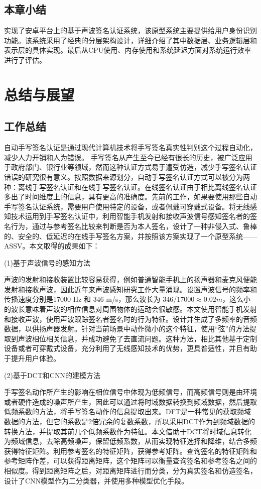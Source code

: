 \section{本章小结}
实现了安卓平台上的基于声波签名认证系统，该原型系统主要提供给用户身份识别功能。该系统采用了经典的分层架构设计，详细介绍了其中数据层、业务逻辑层和表示层的具体实现。最后从CPU使用、内存使用和系统延迟方面对系统运行效率进行了评估。

\chapter{总结与展望}

\section{工作总结}

自动手写签名认证是通过现代计算机技术将手写签名真实性判别这个过程自动化，减少人力开销和人为错误。 手写签名从产生至今已经有很长的历史，被广泛应用于政府部门、银行业等领域，然而这种认证方式易于遭受仿造，减少手写签名认证错误的研究很有意义。按照数据来源划分，自动手写签名认证方式可以被分为两种：离线手写签名认证和在线手写签名认证。在线签名认证由于相比离线签名认证多出了时间维度上的信息，具有更高的准确度。先前的工作，如果要使用那些自动手写签名认证系统，需要用户使用特定的设备，或者佩戴可穿戴式设备。将无线感知技术运用到手写签名认证中，利用智能手机发射和接收声波信号感知签名者的签名行为，通过与参考签名比较来判断是否为本人签名，设计了一种非侵入式、鲁棒的、安全的、低延迟的在线手写签名方案，并按照该方案实现了一个原型系统——ASSV。本文取得的成果如下：

(1)基于声波信号的感知方法

声波的发射和接收装置比较容易获得，例如普通智能手机上的扬声器和麦克风便能发射和接收声波，因此近年来声波感知研究工作大量涌现。设置声波信号的频率和传播速度分别是17000 Hz 和 346 m/s，那么波长为  $346/17000\approx0.02m$，这么小的波长意味着声波的相位信息对周围物体的运动会很敏感。本文使用智能手机发射和接收声波，使用声波跟踪签名者签名时的行为特征。设计并生成了多频率的音频数据，以供扬声器发射。针对当前场景中动作微小的这个特征，使用“弦”的方法提取到声波相位相关信息，并成功避免了去直流问题。这种方法，相比其他基于定制设备或者可穿戴式设备，充分利用了无线感知技术的优势，更具普适性，并且有助于提升用户体验。

(2)基于DCT和CNN的建模方法

手写签名动作所产生的影响在相位信号中体现为低频信号，而高频信号则是由环境或者硬件造成的噪声所产生，因此可以通过将时域数据转换到频域数据，然后提取低频系数的方法，将手写签名动作的信息提取出来。DFT是一种常见的获取频域数据的方法，但它的系数是2倍冗余的复数系数，所以采用DCT作为到频域数据的转换方法，并提取其前几个低频系数作为特征。本文借助于DCT将时域信息转化为频域信息，去除高频噪声，保留低频系数，从而实现特征选择和降维，结合多频获得特征矩阵。利用参考签名的特征矩阵，获得参考矩阵。查询签名的特征矩阵和参考矩阵作差，可以获得距离矩阵，这个矩阵可以衡量查询签名和参考签名之间的相似度。得到距离矩阵之后，对距离矩阵进行而分类，分为真实签名和仿造签名，设计了CNN模型作为二分类器，并使用多种模型优化手段。

